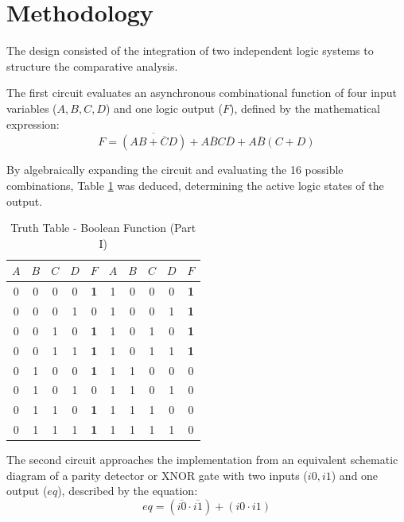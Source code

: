 \documentclass[conference]{IEEEtran}
\begin{document}
\section{Methodology}
The design consisted of the integration of two independent logic systems to structure the comparative analysis. 

The first circuit evaluates an asynchronous combinational function of four input variables ($A, B, C, D$) and one logic output ($F$), defined by the mathematical expression:
\begin{equation}
F = \overline{(AB+\overline{C}D)} + A\overline{B}C\overline{D} + A\overline{B}(C+D)
\end{equation}

By algebraically expanding the circuit and evaluating the 16 possible combinations, Table \ref{tab1} was deduced, determining the active logic states of the output.

\begin{table}[htbp]
\caption{Truth Table - Boolean Function (Part I)}
\begin{center}
\begin{tabular}{ccccc|ccccc}
\toprule
$A$ & $B$ & $C$ & $D$ & $F$ & $A$ & $B$ & $C$ & $D$ & $F$ \\
\midrule
0 & 0 & 0 & 0 & \textbf{1} & 1 & 0 & 0 & 0 & \textbf{1} \\
0 & 0 & 0 & 1 & 0 & 1 & 0 & 0 & 1 & \textbf{1} \\
0 & 0 & 1 & 0 & \textbf{1} & 1 & 0 & 1 & 0 & \textbf{1} \\
0 & 0 & 1 & 1 & \textbf{1} & 1 & 0 & 1 & 1 & \textbf{1} \\
0 & 1 & 0 & 0 & \textbf{1} & 1 & 1 & 0 & 0 & 0 \\
0 & 1 & 0 & 1 & 0 & 1 & 1 & 0 & 1 & 0 \\
0 & 1 & 1 & 0 & \textbf{1} & 1 & 1 & 1 & 0 & 0 \\
0 & 1 & 1 & 1 & \textbf{1} & 1 & 1 & 1 & 1 & 0 \\
\bottomrule
\end{tabular}
\label{tab1}
\end{center}
\end{table}

The second circuit approaches the implementation from an equivalent schematic diagram of a parity detector or XNOR gate with two inputs ($i0, i1$) and one output ($eq$), described by the equation:
\begin{equation}
eq = (\overline{i0} \cdot \overline{i1}) + (i0 \cdot i1)
\end{equation}
\end{document}
